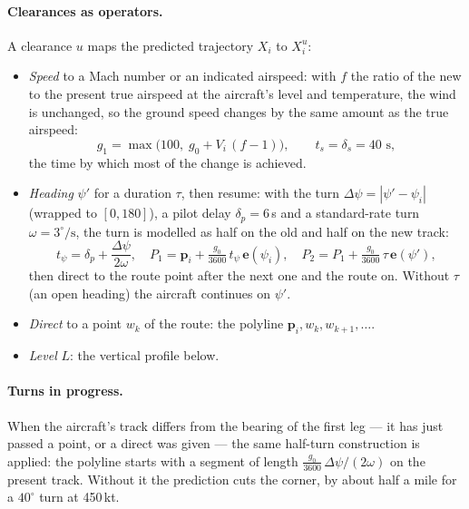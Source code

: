 \documentclass[11pt,a4paper]{article}
\begin{document}
\paragraph{Clearances as operators.} A clearance $u$ maps the predicted trajectory $X_i$ to $X_i^u$:
\begin{itemize}
\item \emph{Speed} to a Mach number or an indicated airspeed: with $f$ the ratio of the new to the present true
airspeed at the aircraft's level and temperature, the wind is unchanged, so the ground speed changes by the same
amount as the true airspeed:
\begin{equation}
g_1 = \max\!\big(100,\; g_0 + V_i\,(f-1)\big),\qquad t_s = \delta_s = 40\text{ s},
\end{equation}
the time by which most of the change is achieved.
\item \emph{Heading} $\psi'$ for a duration $\tau$, then resume: with the turn $\Delta\psi = |\psi'-\psi_i|$
(wrapped to $[0,180]$), a pilot delay $\delta_p = 6$\,s and a standard-rate turn $\omega=3^\circ/\mathrm{s}$, the turn
is modelled as half on the old and half on the new track:
\begin{equation}
t_\psi = \delta_p + \frac{\Delta\psi}{2\omega},\quad
P_1 = \bm p_i + \tfrac{g_0}{3600}\, t_\psi\, \bm e(\psi_i),\quad
P_2 = P_1 + \tfrac{g_0}{3600}\, \tau\, \bm e(\psi'),
\end{equation}
then direct to the route point after the next one and the route on. Without $\tau$ (an open heading) the
aircraft continues on $\psi'$.
\item \emph{Direct} to a point $w_k$ of the route: the polyline $\bm p_i, w_k, w_{k+1},\dots$.
\item \emph{Level} $L$: the vertical profile below.
\end{itemize}

\paragraph{Turns in progress.} When the aircraft's track differs from the bearing of the first leg --- it has just
passed a point, or a direct was given --- the same half-turn construction is applied: the polyline starts with a
segment of length $\tfrac{g_0}{3600}\,\Delta\psi/(2\omega)$ on the present track. Without it the prediction cuts
the corner, by about half a mile for a $40^\circ$ turn at 450\,kt.
\end{document}
